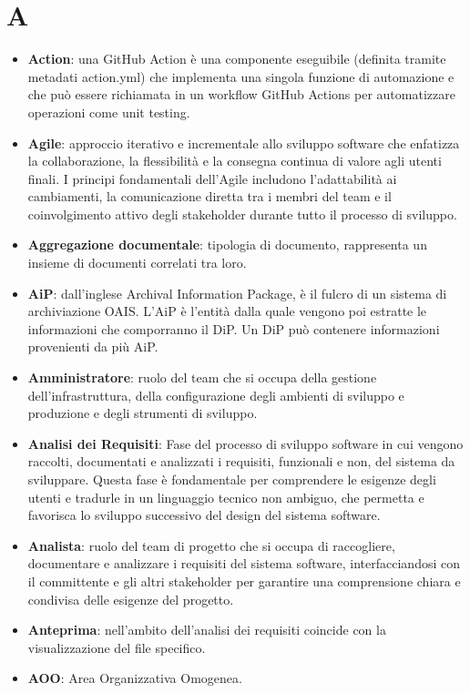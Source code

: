 \documentclass[a4paper,12pt]{article}
\begin{document}
\section{A}
\begin{itemize}
    \item \textbf{Action}: una GitHub Action è una componente eseguibile (definita tramite metadati action.yml) che implementa una singola funzione di automazione e che può essere richiamata in un workflow GitHub Actions per automatizzare operazioni come unit testing.
    \item \textbf{Agile}: approccio iterativo e incrementale allo sviluppo software che enfatizza la collaborazione, la flessibilità e la consegna continua di valore agli utenti finali. I principi fondamentali dell'Agile includono l'adattabilità ai cambiamenti, la comunicazione diretta tra i membri del team e il coinvolgimento attivo degli stakeholder durante tutto il processo di sviluppo.
    \item \textbf{Aggregazione documentale}: tipologia di documento, rappresenta un insieme di documenti correlati tra loro.
    \item \textbf{AiP}: dall'inglese Archival Information Package, è il fulcro di un sistema di archiviazione OAIS. L'AiP è l'entità dalla quale vengono poi estratte le informazioni che comporranno il DiP. Un DiP può contenere informazioni provenienti da più AiP.  
    \item \textbf{Amministratore}: ruolo del team che si occupa della gestione dell'infrastruttura, della configurazione degli ambienti di sviluppo e produzione e degli strumenti di sviluppo.
    \item \textbf{Analisi dei Requisiti}: Fase del processo di sviluppo software in cui vengono raccolti, documentati e analizzati i requisiti, funzionali e non, del sistema da sviluppare. Questa fase è fondamentale per comprendere le esigenze degli utenti e tradurle in un linguaggio tecnico non ambiguo, che permetta e favorisca lo sviluppo successivo del design del sistema software.
    \item \textbf{Analista}: ruolo del team di progetto che si occupa di raccogliere, documentare e analizzare i requisiti del sistema software, interfacciandosi con il committente e gli altri stakeholder per garantire una comprensione chiara e condivisa delle esigenze del progetto.
    \item \textbf{Anteprima}: nell'ambito dell'analisi dei requisiti coincide con la visualizzazione del file specifico.
    \item \textbf{AOO}: Area Organizzativa Omogenea.

\end{itemize}
\end{document}
